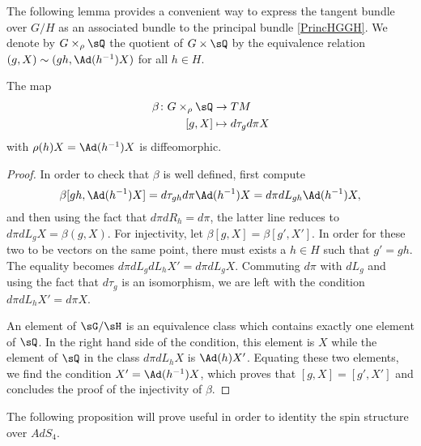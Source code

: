 The following lemma provides  a convenient way to express the tangent bundle over $G/H$ as an associated bundle to the principal bundle \eqref{PrincHGGH}. We denote by $G\times_{\rho} \sQ$ the quotient of $G\times\sQ$ by the equivalence relation $(g,X)\sim(gh,\Ad(h^{-1})X)$ for all $h\in H$.

\begin{lemma}
	The map
	\begin{equation}
		\begin{aligned}
			\beta\colon G\times_{\rho}\sQ & \to TM                \\
			[g,X]                         & \mapsto d\tau_gd\pi X
		\end{aligned}
	\end{equation}
	with $\rho(h)X=\Ad(h^{-1})X$ is diffeomorphic.
	\label{LemBazHGGH}
\end{lemma}

\begin{proof}

	In order to check that $\beta$ is well defined, first compute
	\[
		\beta[gh,\Ad(h^{-1})X]=d\tau_{gh}d\pi\Ad(h^{-1})X=d\pi dL_{gh}\Ad(h^{-1})X,
	\]
	and then using the fact that $d\pi dR_h=d\pi$, the latter line reduces to $d\pi dL_gX=\beta(g,X)$. For injectivity, let $\beta[g,X]=\beta[g',X']$. In order for these two to be vectors on the same point, there must exists a $h\in H$ such that $g'=gh$. The equality becomes $d\pi dL_g dL_h X'=d\pi dL_gX$. Commuting $d\pi$ with $dL_g$ and using the fact that $d\tau_g$ is an isomorphism, we are left with the condition $d\pi dL_h X'=d\pi X$.

	An element of $\sG/\sH$ is an equivalence class which contains exactly one element of $\sQ$. In the right hand side of the condition, this element is $X$ while the element of $\sQ$ in the class $d\pi dL_h X$ is $\Ad(h)X'$. Equating these two elements, we find the condition $X'=\Ad(h^{-1})X$, which proves that $[g,X]=[g',X']$ and concludes the proof of the injectivity of $\beta$.
\end{proof}

The following proposition will prove useful in order to identity the spin structure over $AdS_4$.

